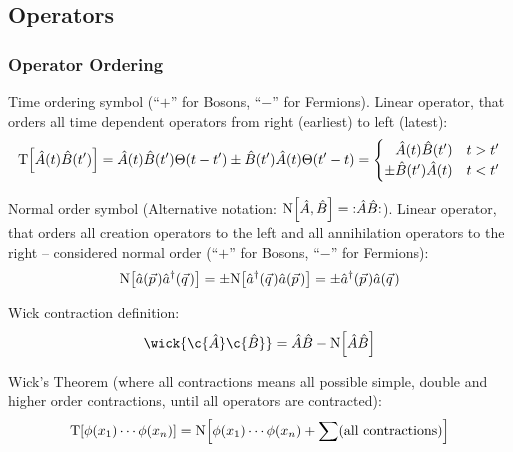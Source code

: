 	\subsection{Operators}
		\subsubsection{Operator Ordering}
			Time ordering symbol (``$+$'' for Bosons, ``$-$'' for Fermions). Linear operator, that orders all time dependent operators from right (earliest) to left (latest):
			\begin{equation}
				\mathrm{T}\qty[\hat{A}(t)\hat{B}(t')]
				= \hat{A}(t) \hat{B}(t') \Theta(t-t') \pm \hat{B}(t') \hat{A}(t) \Theta(t'-t)
				= \begin{cases}
					\phantom{\pm} \hat{A}(t) \hat{B}(t') & t>t' \\
					\pm \hat{B}(t') \hat{A}(t) & t<t'
				\end{cases}
			\end{equation}

			\noindent
			Normal order symbol (Alternative notation: $\mathrm{N}\qty[\hat{A},\hat{B}] = \;:\mathrel{\hat{A} \hat{B}}:$). Linear operator, that orders all creation operators to the left and all annihilation operators to the right -- considered normal order (``$+$'' for Bosons, ``$-$'' for Fermions):
			\begin{equation}
				\begin{aligned}
					\NormalOrder{\hat{a}(\vec{p})\hat{a}^\dagger(\vec{q})}
					&= \pm \NormalOrder{\hat{a}^\dagger(\vec{q})\hat{a}(\vec{p})} = \pm \hat{a}^\dagger(\vec{p}) \hat{a}(\vec{q}) \\
				\end{aligned}
			\end{equation}

			\noindent
			Wick contraction definition:
			\begin{equation}
				\wick{\c{\hat{A}} \c{\hat{B}}} = \hat{A}\hat{B} - \NormalOrder{\hat{A}\hat{B}}
			\end{equation}

			\noindent
			Wick's Theorem (where all contractions means all possible simple, double and higher order contractions, until all operators are contracted):
			\begin{equation}
				\mathrm{T}\qty[\phi(x_1)\dotsb\phi(x_n)] = \mathrm{N}\qty[\phi(x_1)\dotsb\phi(x_n) + \sum(\text{all contractions})]
			\end{equation}

